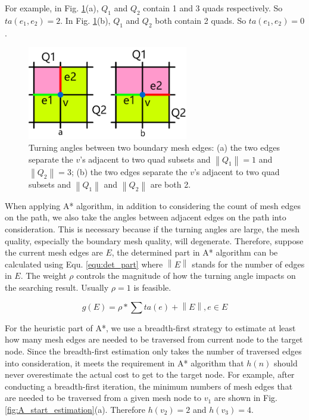 \documentclass[final,5p,times,twocolumn]{elsarticle}
\begin{document}
For example, in Fig. \ref{fig:turning_angle}(a), $Q_1$ and $Q_2$ contain 1 and 3 quads respectively. So $ta(e_1,e_2)=2$. In Fig. \ref{fig:turning_angle}(b), $Q_1$ and $Q_2$ both contain 2 quads. So $ta(e_1,e_2)=0$.

\begin{figure}[htbp]
\begin{center}
\includegraphics[width=7cm]{rev_figures/turning_angle.png}
\caption{Turning angles between two boundary mesh edges: (a) the two edges separate the $v$'s adjacent to two quad subsets and $\left \| Q_1 \right \|=1$ and $\left \| Q_2 \right \|=3$; (b) the two edges separate the $v$'s adjacent to two quad subsets and $\left \| Q_1 \right \|$ and $\left \| Q_2 \right \|$ are both 2.}
\label{fig:turning_angle}
\end{center}
\end{figure}

When applying A* algorithm, in addition to considering the count of mesh edges on the path, we also take the angles between adjacent edges on the path into consideration. This is necessary because if the turning angles are large, the mesh quality, especially the boundary mesh quality, will degenerate. Therefore, suppose the current mesh edges are $E$, the determined part in A* algorithm can be calculated using Equ. \ref{equ:det_part} where $\left \| E \right \|$ stands for the number of edges in $E$. The weight $\rho $ controls the magnitude of how the turning angle impacts on the searching result. Usually $\rho =1$ is feasible.

\begin{equation}
\label{equ:det_part}
g(E) = \rho * \sum ta(e) + \left \| E \right \|, e \in E
\end{equation}

For the heuristic part of A*, we use a breadth-first strategy to estimate at least how many mesh edges are needed to be traversed from current node to the target node. Since the breadth-first estimation only takes the number of traversed edges into consideration, it meets the requirement in A* algorithm that $h(n)$ should never overestimate the actual cost to get to the target node. For example, after conducting a breadth-first iteration, the minimum numbers of mesh edges that are needed to be traversed from a given mesh node to $v_1$ are shown in Fig. \ref{fig:A_start_estimation}(a). Therefore $h(v_2)=2$ and $h(v_3)=4$.
\end{document}
